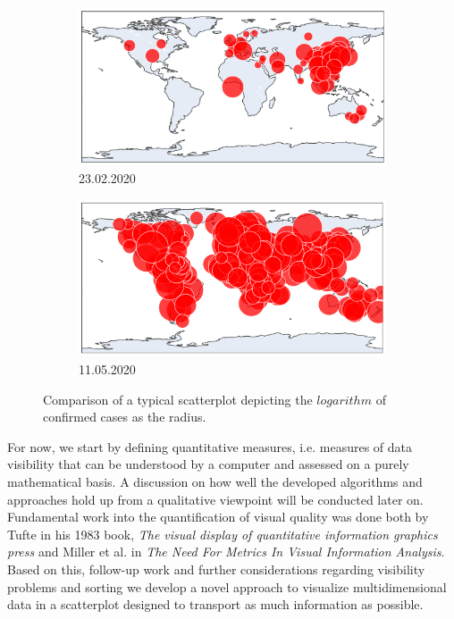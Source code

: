 \documentclass[a4paper,11pt]{article}
\begin{document}
%
\begin{figure}[h]
  \begin{subfigure}{0.5\textwidth}
    \includegraphics[width=0.9\linewidth]{covid_spread_20200223.png}
    \caption{23.02.2020}\label{fig:covid2020Feb}
  \end{subfigure}
  \begin{subfigure}{0.5\textwidth}
    \includegraphics[width=0.9\linewidth]{covid_spread_20200511.png}
    \caption{11.05.2020}\label{fig:covid2020May}
  \end{subfigure}
  \caption{Comparison of a typical scatterplot depicting the $logarithm$ of confirmed cases as the radius.}
  \label{fig:covid19}
\end{figure}
%

For now, we start by defining quantitative measures, i.e. measures of data visibility that can be understood by a computer and assessed on a purely mathematical basis. A discussion on how well the developed algorithms and approaches hold up from a qualitative viewpoint will be conducted later on.\\

Fundamental work into the quantification of visual quality was done both by Tufte in his 1983 book, \textit{The visual display of quantitative information graphics press} and Miller et al. in \textit{The Need For Metrics In Visual Information Analysis}. Based on this, follow-up work and further considerations regarding visibility problems and sorting we develop a novel approach to visualize multidimensional data in a scatterplot designed to transport as much information as possible.\\
\end{document}
